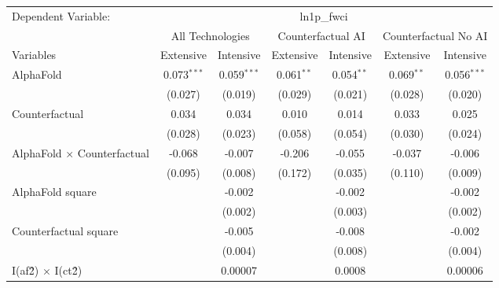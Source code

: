 \begingroup
\centering
\begin{tabular}{lcccccc}
   \tabularnewline \midrule \midrule
   Dependent Variable: & \multicolumn{6}{c}{ln1p\_fwci}\\
 & \multicolumn{2}{c}{All Technologies} & \multicolumn{2}{c}{Counterfactual AI} & \multicolumn{2}{c}{Counterfactual No AI} \\
\cmidrule(lr){1-1}\cmidrule(lr){2-3} \cmidrule(lr){4-5} \cmidrule(lr){6-7}
Variables & \multicolumn{1}{c}{Extensive} & \multicolumn{1}{c}{Intensive} & \multicolumn{1}{c}{Extensive} & \multicolumn{1}{c}{Intensive} & \multicolumn{1}{c}{Extensive} & \multicolumn{1}{c}{Intensive} \\
\cmidrule(lr){1-1}\cmidrule(lr){2-2} \cmidrule(lr){3-3} \cmidrule(lr){4-4} \cmidrule(lr){5-5} \cmidrule(lr){6-6} \cmidrule(lr){7-7}
   AlphaFold                          & 0.073$^{***}$ & 0.059$^{***}$ & 0.061$^{**}$ & 0.054$^{**}$ & 0.069$^{**}$ & 0.056$^{***}$\\   
                                      & (0.027)       & (0.019)       & (0.029)      & (0.021)      & (0.028)      & (0.020)\\   
   Counterfactual                     & 0.034         & 0.034         & 0.010        & 0.014        & 0.033        & 0.025\\   
                                      & (0.028)       & (0.023)       & (0.058)      & (0.054)      & (0.030)      & (0.024)\\   
   AlphaFold $\times$ Counterfactual  & -0.068        & -0.007        & -0.206       & -0.055       & -0.037       & -0.006\\   
                                      & (0.095)       & (0.008)       & (0.172)      & (0.035)      & (0.110)      & (0.009)\\   
   AlphaFold square                   &               & -0.002        &              & -0.002       &              & -0.002\\   
                                      &               & (0.002)       &              & (0.003)      &              & (0.002)\\   
   Counterfactual square              &               & -0.005        &              & -0.008       &              & -0.002\\   
                                      &               & (0.004)       &              & (0.008)      &              & (0.004)\\   
   I(af\^2) $\times$ I(ct\^2)         &               & 0.00007       &              & 0.0008       &              & 0.00006\\   

\end{tabular}
